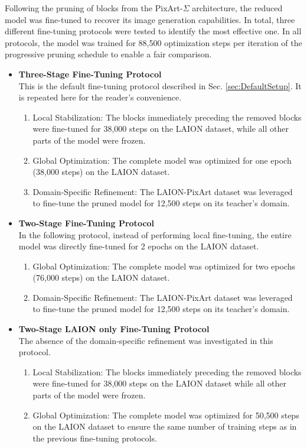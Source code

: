 Following the pruning of blocks from the PixArt-$\Sigma$ architecture, the reduced model was fine-tuned to recover its image generation capabilities. In total, three different fine-tuning protocols were tested to identify the most effective one. In all protocols, the model was trained for 88,500 optimization steps per iteration of the progressive pruning schedule to enable a fair comparison.
 \begin{itemize}
 	\item \textbf{Three-Stage Fine-Tuning Protocol} \\
 	This is the default fine-tuning protocol described in Sec. \ref{sec:DefaultSetup}. It is repeated here for the reader's convenience.
 	\begin{enumerate}
 		\item Local Stabilization: The blocks immediately preceding the removed blocks were fine-tuned for 38,000 steps on the LAION dataset, while all other parts of the model were frozen.
 		\item Global Optimization: The complete model was optimized for one epoch (38,000 steps) on the LAION dataset.
 		\item Domain-Specific Refinement: The LAION-PixArt dataset was leveraged to fine-tune the pruned model for 12,500 steps on its teacher's domain.
 	\end{enumerate}
 	
 	\item \textbf{Two-Stage Fine-Tuning Protocol} \\
 	In the following protocol, instead of performing local fine-tuning, the entire model was directly fine-tuned for 2 epochs on the LAION dataset.
 	\begin{enumerate}
 		 	\item Global Optimization: The complete model was optimized for two epochs (76,000 steps) on the LAION dataset.
 		\item Domain-Specific Refinement: The LAION-PixArt dataset was leveraged to fine-tune the pruned model for 12,500 steps on its teacher's domain.
 	\end{enumerate}

 	\item \textbf{Two-Stage LAION only Fine-Tuning Protocol} \\
 	The absence of the domain-specific refinement was investigated in this protocol.
 	\begin{enumerate}
 		\item Local Stabilization: The blocks immediately preceding the removed blocks were fine-tuned for 38,000 steps on the LAION dataset while all other parts of the model were frozen.
 		\item Global Optimization: The complete model was optimized for 50,500 steps on the LAION dataset to ensure the same number of training steps as in the previous fine-tuning protocols.
 	\end{enumerate}
 \end{itemize}

